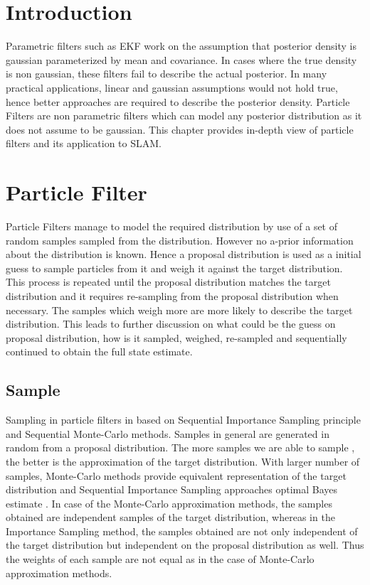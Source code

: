 \section*{Introduction}
Parametric filters such as EKF work on the assumption that posterior density is gaussian parameterized by mean and covariance. In cases where the true density is non gaussian, these filters fail to describe the actual posterior. In many practical applications, linear and gaussian assumptions would not hold true, hence better approaches are required to describe the posterior density. Particle Filters are non parametric filters which can model any posterior distribution as it does not assume to be gaussian. This chapter provides in-depth view of particle filters and its application to SLAM.
\section{Particle Filter}
Particle Filters manage to model the required distribution by use of a set of random samples sampled from the distribution. However no a-prior information about the distribution is known. Hence a proposal distribution is used as a initial guess to sample particles from it and weigh it against the target distribution. This process is repeated until the proposal distribution matches the target distribution and it requires re-sampling from the proposal distribution when necessary. The samples which weigh more are more likely to describe the target distribution. This leads to further discussion on what could be the guess on proposal distribution, how is it sampled, weighed, re-sampled and sequentially continued to obtain the full state estimate.

\subsection{Sample}
Sampling in particle filters in based on Sequential Importance Sampling principle and Sequential Monte-Carlo methods. Samples in general are generated in random from a proposal distribution. The more samples we are able to sample , the better is the approximation of the target distribution. With larger number of samples, Monte-Carlo methods provide equivalent representation of the target distribution and Sequential Importance Sampling approaches optimal Bayes estimate \cite{S.Arulampalam}. In case of the Monte-Carlo approximation methods, the samples obtained are independent samples of the target distribution, whereas in the Importance Sampling method, the samples obtained are not only independent of the target distribution but independent on the proposal distribution as well. Thus the weights of each sample are not equal as in the case of Monte-Carlo approximation methods.

